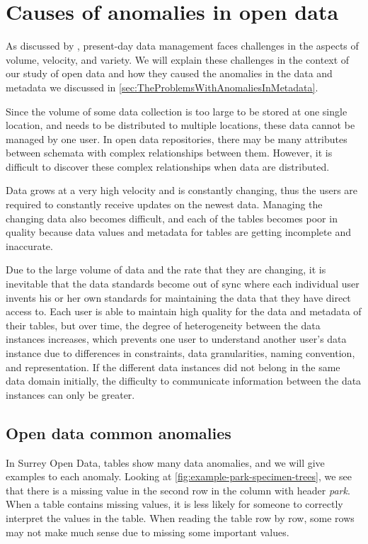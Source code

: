 \section{Causes of anomalies in open data}
\label{sec:CausesOfAnomaliesInOpenData}

As discussed by \cite{10.1145/2845915}, present-day data management faces challenges in the aspects of volume, velocity, and variety. We will explain these challenges in the context of our study of open data and how they caused the anomalies in the data and metadata we discussed in \autoref{sec:TheProblemsWithAnomaliesInMetadata}.

Since the volume of some data collection is too large to be stored at one single location, and needs to be distributed to multiple locations, these data cannot be managed by one user. In open data repositories, there may be many attributes between schemata with complex relationships between them. However, it is difficult to discover these complex relationships when data are distributed.

Data grows at a very high velocity and is constantly changing, thus the users are required to constantly receive updates on the newest data. Managing the changing data also becomes difficult, and each of the tables becomes poor in quality because data values and metadata for tables are getting incomplete and inaccurate.

Due to the large volume of data and the rate that they are changing, it is inevitable that the data standards become out of sync where each individual user invents his or her own standards for maintaining the data that they have direct access to. Each user is able to maintain high quality for the data and metadata of their tables, but over time, the degree of heterogeneity between the data instances increases, which prevents one user to understand another user's data instance due to differences in constraints, data granularities, naming convention, and representation. If the different data instances did not belong in the same data domain initially, the difficulty to communicate information between the data instances can only be greater.

\subsection{Open data common anomalies}

In Surrey Open Data, tables show many data anomalies, and we will give examples to each anomaly. Looking at \autoref{fig:example-park-specimen-trees}, we see that there is a missing value in the second row in the column with header \textit{park}. When a table contains missing values, it is less likely for someone to correctly interpret the values in the table. When reading the table row by row, some rows may not make much sense due to missing some important values.

